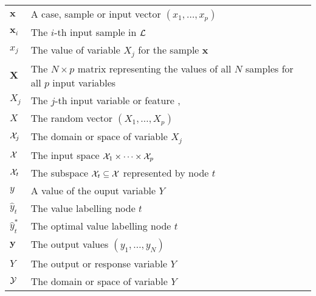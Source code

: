 \begin{tabularx}{\textwidth}{ l X }
$\textbf{x}$ & A case, sample or input vector $(x_1, \dots, x_p)$ \dotfill  \pageref{ntn:sample-x}\\
$\textbf{x}_i$ & The $i$-th input sample in ${\cal L}$ \dotfill  \pageref{ntn:sample-x_i}\\
$x_j$ & The value of variable $X_j$ for the sample $\textbf{x}$ \dotfill  \pageref{ntn:value-x_j}\\
$\textbf{X}$ & The $N\times p$ matrix representing the values of all $N$ samples for all $p$ input variables \dotfill  \pageref{ntn:matrix-X}\\
$X_j$ & The $j$-th input variable or feature \dotfill  \pageref{ntn:var-X_j}, \pageref{ntn:var-X_j2}\\
$X$ & The random vector $(X_1,\dots,X_p)$ \dotfill  \pageref{ntn:vector-X}\\
${\cal X}_j$ & The domain or space of variable $X_j$ \dotfill  \pageref{ntn:space-X_j}\\
${\cal X}$ & The input space ${\cal X}_1 \times \dots \times {\cal X}_p$ \dotfill  \pageref{ntn:space-X}\\
${\cal X}_t$ & The subspace ${\cal X}_t \subseteq {\cal X}$ represented by node $t$ \dotfill  \pageref{ntn:node-space}\\
$y$ & A value of the ouput variable $Y$ \dotfill  \pageref{ntn:value-y}\\
$\widehat{y}_t$ & The value labelling node $t$ \dotfill  \pageref{ntn:y_t}\\
$\widehat{y}_t^*$ & The optimal value labelling node $t$ \dotfill  \pageref{ntn:y_t-star}\\
$\mathbf{y}$ & The output values $(y_1,\dots,y_N)$ \dotfill  \pageref{ntn:vector-y}\\
$Y$ & The output or response variable $Y$ \dotfill  \pageref{ntn:var-Y}\\
${\cal Y}$ & The domain or space of variable $Y$ \dotfill  \pageref{ntn:space-Y}\\
\end{tabularx}
